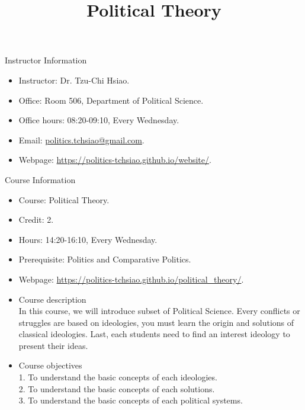 \documentclass{article}
\title{\fontsize{16pt}{16pt}\selectfont Political Theory}
\author{}
\date{}
\begin{document}
\maketitle
\fontsize{14pt}{14pt}\selectfont
\begin{flushleft}
Instructor Information
\end{flushleft}
\begin{itemize}
\item Instructor: Dr. Tzu-Chi Hsiao. \\
\item Office: Room 506, Department of Political Science. \\
\item Office hours: 08:20-09:10, Every Wednesday. \\
\item Email: \href{mailto:politics.tchsiao@gmail.com}{politics.tchsiao@gmail.com}. \\
\item Webpage: \href{https://politics-tchsiao.github.io/website/}{https://politics-tchsiao.github.io/website/}. \\
\end{itemize}
Course Information \\
\begin{itemize}
\item Course: Political Theory. \\
\item Credit: 2. \\
\item Hours: 14:20-16:10, Every Wednesday. \\
\item Prerequisite: Politics and Comparative Politics. \\
\item Webpage: \href{https://politics-tchsiao.github.io/political\_theory/}{https://politics-tchsiao.github.io/political\_theory/}. \\
\item Course description \\
In this course, we will introduce subset of Political Science. Every conflicts or struggles are based on ideologies, you must learn the origin and solutions of classical ideologies. Last, each students need to find an interest ideology to present their ideas. \\ 
\item Course objectives \\
1. To understand the basic concepts of each ideologies. \\
2. To understand the basic concepts of each solutions. \\
3. To understand the basic concepts of each political systems. \\
\end{itemize}
\end{document}

